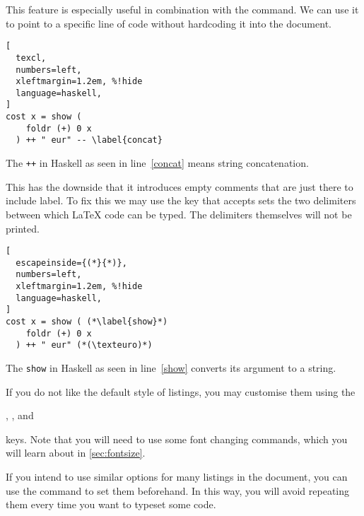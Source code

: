 This feature is especially useful in combination with the  command.
We can use it to point to a specific line of code without hardcoding it into the
document.
\begin{example}
\begin{lstlisting}[
  texcl,
  numbers=left,
  xleftmargin=1.2em, %!hide
  language=haskell,
]
cost x = show (
    foldr (+) 0 x
  ) ++ " eur" -- \label{concat}
\end{lstlisting}
The \lstinline|++| in Haskell
as seen in line~\ref{concat}
means string concatenation.
\end{example}
This has the downside that it introduces empty comments that are just there to
include label. To fix this we may use the  key that accepts
sets the two delimiters between which \LaTeX{} code can be typed. The
delimiters themselves will not be printed.
\begin{example}
  \begin{lstlisting}[
  escapeinside={(*}{*)},
  numbers=left,
  xleftmargin=1.2em, %!hide
  language=haskell,
]
cost x = show ( (*\label{show}*)
    foldr (+) 0 x
  ) ++ " eur" (*(\texteuro)*)
\end{lstlisting}
The \lstinline|show| in Haskell
as seen in line~\ref{show}
converts its argument to a string.
\end{example}


If you do not like the default style of listings, you may customise them using
the
\begin{lscommand}
  , ,  and
\end{lscommand}
keys. Note that you will need to use some font changing commands, which
you will learn about in \autoref{sec:fontsize}.
\begin{example}[examplewidth=0.55\linewidth]

\end{example}

If you intend to use similar options for many listings in the document, you can
use the  command to set them beforehand. In this way, you will avoid
repeating them every time you want to typeset some code.

